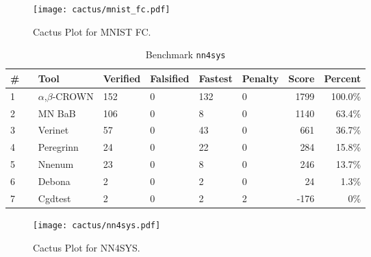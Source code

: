 \begin{figure}[h]
\centerline{\texttt{[image: cactus/mnist\_fc.pdf]}}
\caption{Cactus Plot for MNIST FC.}
\label{fig:quantPic}
\end{figure}



\begin{table}[h]
\begin{center}
\caption{Benchmark \texttt{nn4sys}} \label{tab:cat_{cat}}
{\setlength{\tabcolsep}{2pt}
\begin{tabular}[h]{@{}llllllrr@{}}
\toprule
\textbf{\# ~} & \textbf{Tool} & \textbf{Verified} & \textbf{Falsified} & \textbf{Fastest} & \textbf{Penalty} & \textbf{Score} & \textbf{Percent}\\
\midrule
1 & $\alpha$,$\beta$-CROWN & 152 & 0 & 132 & 0 & 1799 & 100.0\% \\
2 & MN BaB & 106 & 0 & 8 & 0 & 1140 & 63.4\% \\
3 & Verinet & 57 & 0 & 43 & 0 & 661 & 36.7\% \\
4 & Peregrinn & 24 & 0 & 22 & 0 & 284 & 15.8\% \\
5 & Nnenum & 23 & 0 & 8 & 0 & 246 & 13.7\% \\
6 & Debona & 2 & 0 & 2 & 0 & 24 & 1.3\% \\
7 & Cgdtest & 2 & 0 & 2 & 2 & -176 & 0\% \\
\bottomrule
\end{tabular}
}
\end{center}
\end{table}



\begin{figure}[h]
\centerline{\texttt{[image: cactus/nn4sys.pdf]}}
\caption{Cactus Plot for NN4SYS.}
\label{fig:quantPic}
\end{figure}



